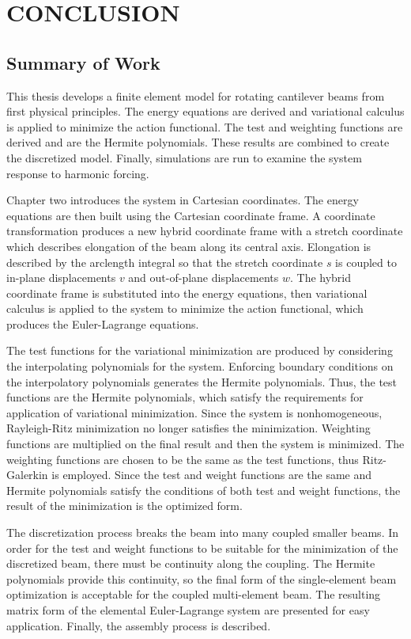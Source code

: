 \chapter{CONCLUSION}
\label{ch:conclusion}
\section{Summary of Work}
This thesis develops a finite element model for rotating cantilever beams from first physical principles. The energy equations are derived and variational calculus is applied to minimize the action functional. The test and weighting functions are derived and are the Hermite polynomials. These results are combined to create the discretized model. Finally, simulations are run to examine the system response to harmonic forcing.

Chapter two introduces the system in Cartesian coordinates.  The energy equations are then built using the Cartesian coordinate frame. A coordinate transformation produces a new hybrid coordinate frame with a stretch coordinate which describes elongation of the beam along its central axis. Elongation is described by the arclength integral so that the stretch coordinate $s$ is coupled to in-plane displacements $v$ and out-of-plane displacements $w$. The hybrid coordinate frame is substituted into the energy equations, then variational calculus is applied to the system to minimize the action functional, which produces the Euler-Lagrange equations. 

The test functions for the variational minimization are produced by considering the interpolating polynomials for the system. Enforcing boundary conditions on the interpolatory polynomials generates the Hermite polynomials. Thus, the test functions are the Hermite polynomials, which satisfy the requirements for application of variational minimization. Since the system is nonhomogeneous, Rayleigh-Ritz minimization no longer satisfies the minimization. Weighting functions are multiplied on the final result and then the system is minimized. The weighting functions are chosen to be the same as the test functions, thus Ritz-Galerkin is employed. Since the test and weight functions are the same and Hermite polynomials satisfy the conditions of both test and weight functions, the result of the minimization is the optimized form.

The discretization process breaks the beam into many coupled smaller beams. In order for the test and weight functions to be suitable for the minimization of the discretized beam, there must be continuity along the coupling. The Hermite polynomials provide this continuity, so the final form of the single-element beam optimization is acceptable for the coupled multi-element beam. The resulting matrix form  of the elemental Euler-Lagrange system are presented for easy application. Finally, the assembly process is described.

